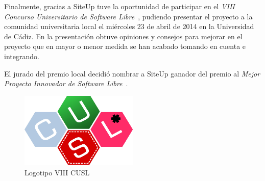 \documentclass[a4paper,12pt]{article}
\begin{document}
Finalmente, gracias a SiteUp tuve la oportunidad de participar en el \textit{VIII Concurso
  Universitario de Software Libre}~\cite{cusl}, pudiendo presentar el proyecto a
la comunidad universitaria local el miércoles 23 de abril de 2014 en la
Universidad de Cádiz. En la presentación obtuve opiniones y consejos para
mejorar en el proyecto que en mayor o menor medida se han acabado tomando en
cuenta e integrando.

El jurado del premio local decidió nombrar a SiteUp ganador del premio al
\textit{Mejor Proyecto Innovador de Software Libre}~\cite{cusl-local}.

\begin{figure}[H]
  \centering
  \includegraphics[width=0.5\textwidth]{logo_cusl}
  \caption{Logotipo VIII CUSL}
\end{figure}


\end{document}
